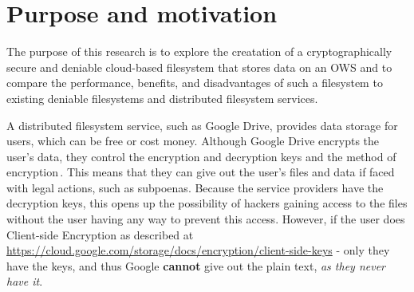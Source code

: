 
\section{Purpose and motivation}

The purpose of this research is to explore the creatation of a cryptographically secure and deniable \mbox{cloud-based} filesystem that stores data on an \gls{OWS} and to compare the performance, benefits, and disadvantages of such a filesystem to existing deniable filesystems and distributed filesystem services.

A distributed filesystem service, such as Google Drive, provides data storage for users, which can be free or cost money. Although Google Drive encrypts the user's data, they control the encryption and decryption keys and the method of encryption\,\cite{johnsonGoogleDriveSecure2021}. This means that they can give out the user's files and data if faced with legal actions, such as subpoenas. Because the service providers have the decryption keys, this opens up the possibility of hackers gaining access to the files without the user having any way to prevent this access. However, if the user does Client-side Encryption as described at \url{https://cloud.google.com/storage/docs/encryption/client-side-keys} - only they have the keys, and thus Google \textbf{cannot} give out the plain text, \textit{as they never have it}.


